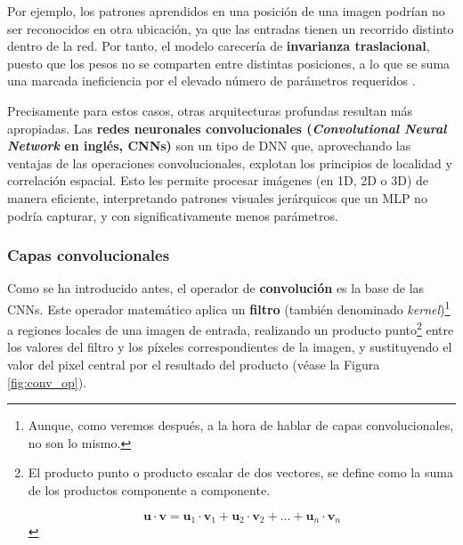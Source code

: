 Por ejemplo, los patrones aprendidos en una posición de una imagen podrían no ser reconocidos en otra 
ubicación, ya que las entradas tienen un recorrido distinto dentro de la red. Por tanto, el modelo carecería       %
de \textbf{invarianza traslacional}, puesto que los pesos no se comparten entre distintas posiciones, a lo que 
se suma una marcada ineficiencia por el elevado número de parámetros requeridos \cite{szeliski2010}.

Precisamente para estos casos, otras arquitecturas profundas resultan más apropiadas.
Las \textbf{redes neuronales convolucionales (\textit{Convolutional Neural Network} en inglés, CNNs)} son un 
tipo de DNN que, aprovechando las ventajas de las operaciones convolucionales, explotan los principios de 
localidad y correlación espacial. Esto les permite procesar imágenes (en 1D, 2D o 3D) de manera eficiente, 
interpretando patrones visuales jerárquicos que un MLP no podría capturar, y con significativamente menos 
parámetros.


\subsubsection{Capas convolucionales}

Como se ha introducido antes, el operador de \textbf{convolución} es la base de las CNNs. Este operador 
matemático aplica un \textbf{filtro} (también denominado \textit{kernel})\footnote{
    Aunque, como veremos después, a la hora de hablar de capas convolucionales, no son lo mismo.
} a regiones locales de una imagen de 
entrada, realizando un producto punto\footnote{El producto punto o producto escalar de dos vectores, se 
define como la suma de los productos componente a componente. 

$$
\mathbf{u} \cdot \mathbf{v} = \mathbf{u}_1 \cdot \mathbf{v}_1 + \mathbf{u}_2 \cdot \mathbf{v}_2 + ... + 
\mathbf{u}_n \cdot \mathbf{v}_n
$$
} 
entre los valores del filtro y los píxeles correspondientes de la imagen, y sustituyendo el valor del pixel 
central por el resultado del producto (véase la Figura \ref{fig:conv_op}).

